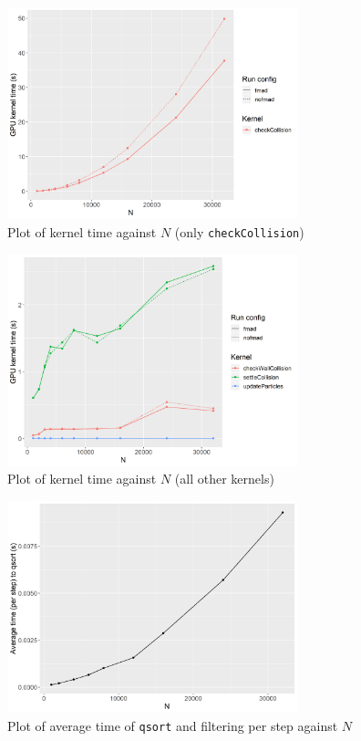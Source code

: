 \documentclass[12pt]{article}
\begin{document}
\begin{figure}[H]
    \centering
    \includegraphics[width=0.75\textwidth]{titan-fmad-kernelTime-checkCollision}
    \caption{Plot of kernel time against $N$ (only \texttt{checkCollision})}
    \label{fig:titan-fmad-kernelTime-checkCollision}
\end{figure}

\begin{figure}[H]
    \centering
    \includegraphics[width=0.75\textwidth]{titan-fmad-kernelTime-noCheckCollision}
    \caption{Plot of kernel time against $N$ (all other kernels)}
    \label{fig:titan-fmad-kernelTime-noCheckCollision}
\end{figure}

\begin{figure}[H]
    \centering
    \includegraphics[width=0.75\textwidth]{avgSortTime}
    \caption{Plot of average time of \texttt{qsort} and filtering per step against $N$}
    \label{fig:avgSortTime}
\end{figure}
\end{document}
